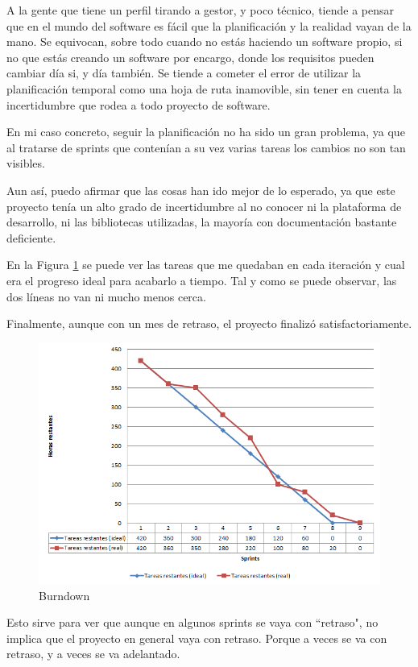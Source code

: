 A la gente que tiene un perfil tirando a gestor, y poco t\'ecnico, tiende a pensar
que en el mundo del software es f\'acil que la planificaci\'on y la realidad
vayan de la mano. Se equivocan, sobre todo cuando no est\'as haciendo un software propio,
si no que est\'as creando un software por encargo, donde los requisitos pueden
cambiar d\'ia si, y d\'ia tambi\'en. Se tiende a cometer el error de utilizar la planificaci\'on
temporal como una hoja de ruta inamovible, sin tener en cuenta la incertidumbre que rodea
a todo proyecto de software.

En mi caso concreto, seguir la planificaci\'on no ha sido un gran problema, ya que al tratarse
de sprints que conten\'ian a su vez varias tareas los cambios no son tan visibles.

Aun as\'i, puedo afirmar que las cosas han ido mejor de lo esperado, ya que este proyecto
ten\'ia un alto grado de incertidumbre al no conocer ni la plataforma de desarrollo, ni las
bibliotecas utilizadas, la mayor\'ia con documentaci\'on bastante deficiente.

En la Figura \ref{fig:burndown} se puede ver las tareas que me quedaban en cada iteraci\'on
y cual era el progreso ideal para acabarlo a tiempo. Tal y como se puede observar,
las dos l\'ineas no van ni mucho menos cerca.

Finalmente, aunque con un mes de retraso, el proyecto finaliz\'o satisfactoriamente.

\begin{figure}[h]
    \centering
    \includegraphics[width=0.8\linewidth]{./Figures/burndown.png}
    \caption{Burndown}
    \label{fig:burndown}
\end{figure}

Esto sirve para ver que aunque en algunos sprints se vaya con ``retraso", no implica que el proyecto
en general vaya con retraso. Porque a veces se va con retraso, y a veces se va adelantado.

